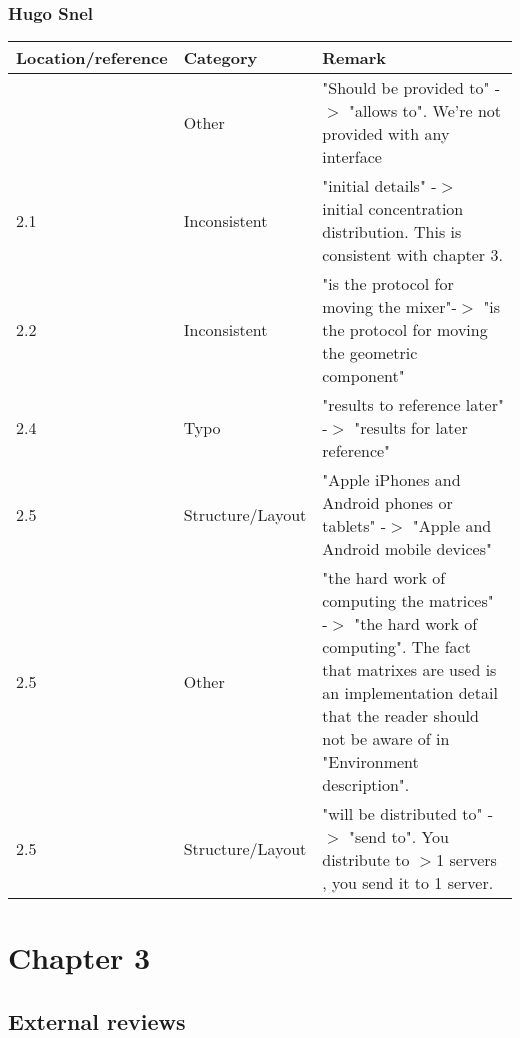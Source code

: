 \subsubsection*{Hugo Snel}

\begin{longtable}{l|l|p{}}
Location/reference & Category & Remark\\
\hline
\hline
\endhead
\hline
\endfoot
2.1 & Other & "Should be provided to" -$>$ "allows to". We're not provided with any interface\\
2.1 & Inconsistent & "initial details" -$>$ initial concentration distribution. This is consistent with chapter 3.\\
2.2 & Inconsistent & "is the protocol for moving the mixer"-$>$ "is the protocol for moving the geometric component"\\
2.4 & Typo & "results to reference later" -$>$ "results for later reference"\\
2.5 & Structure/Layout & "Apple iPhones and Android phones or tablets" -$>$ "Apple and Android mobile devices"\\
2.5 & Other & "the hard work of computing the matrices" -$>$ "the hard work of computing". The fact that matrixes are used is an implementation detail that the reader should not be aware of in "Environment description".\\
2.5 & Structure/Layout & "will be distributed to" -$>$ "send to". You distribute to $>$1 servers , you send it to 1 server.\\
\end{longtable}

\section{Chapter 3}
\subsection{External reviews}
